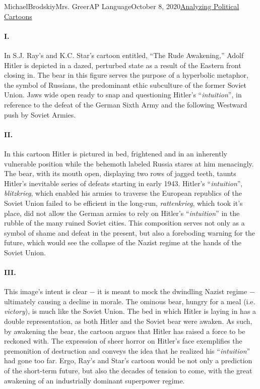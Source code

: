 \documentclass[12pt,letterpaper]{article}
\begin{document}
\begin{mla}{Michael}{Brodskiy}{Mrs. Greer}{AP Language}{October 8, 2020}{\underline{Analyzing Political Cartoons}} 

  \begin{justifying}

    \paragraph{I.} In S.J. Ray's and K.C. Star's cartoon entitled, ``The Rude Awakening,'' Adolf Hitler is depicted in a dazed, perturbed state as a result of the Eastern front closing in. The bear in this figure serves the purpose of a hyperbolic metaphor, the symbol of Russians, the predominant ethic subculture of the former Soviet Union. Jaws wide open ready to snap and questioning Hitler's ``\emph{intuition}'', in reference to the defeat of the German Sixth Army and the following Westward push by Soviet Armies.
    \paragraph{II.} In this cartoon Hitler is pictured in bed, frightened and in an inherently vulnerable position while the behemoth labeled Russia stares at him menacingly. The bear, with its mouth open, displaying two rows of jagged teeth, taunts Hitler's inevitable series of defeats starting in early 1943. Hitler's ``\emph{intuition}'', \textit{blitzkrieg}, which enabled his armies to traverse the European republics of the Soviet Union failed to be efficient in the long-run, \textit{rattenkrieg}, which took it's place, did not allow the German armies to rely on Hitler's ``\emph{intuition}'' in the rubble of the many ruined Soviet cities. This composition serves not only as a symbol of shame and defeat in the present, but also a foreboding warning for the future, which would see the collapse of the Nazist regime at the hands of the Soviet Union.
    \paragraph{III.} This image's intent is clear $-$ it is meant to mock the dwindling Nazist regime $-$ ultimately causing a decline in morale. The ominous bear, hungry for a meal (i.e. \emph{victory}), is much like the Soviet Union. The bed in which Hitler is laying in has a double representation, as both Hitler and the Soviet bear were awaken. As such, by awakening the bear, the cartoon argues that Hitler has raised a force to be reckoned with. The expression of sheer horror on Hitler's face exemplifies the premonition of destruction and conveys the idea that he realized his ``\emph{intuition}'' had gone too far. Ergo, Ray's and Star's cartoon would be not only a prediction of the short-term future, but also the decades of tension to come, with the great awakening of an industrially dominant superpower regime.



\end{justifying}
\end{mla}
\end{document}
